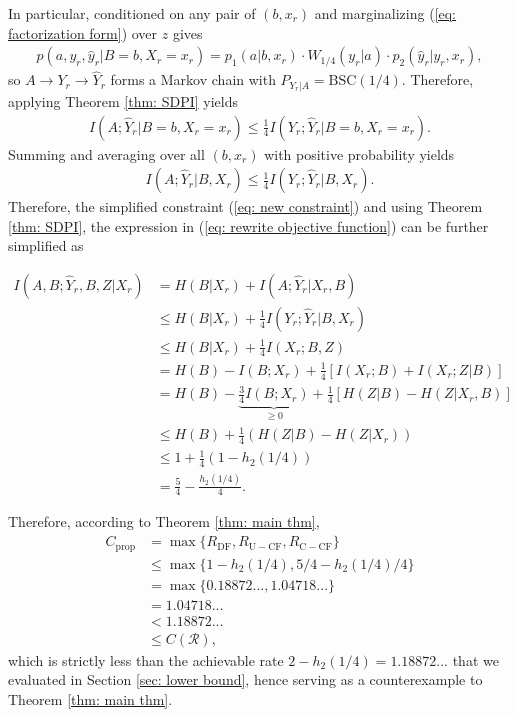 \documentclass[12pt]{article}
\theoremstyle{definition}
\begin{document}
In particular, conditioned on any pair of $(b,x_r)$ and marginalizing (\ref{eq: factorization form}) over $z$ gives
\begin{align*}
    p(a, y_r, \hat{y}_r| B = b, X_r = x_r) = p_1(a|b, x_r) \cdot W_{1/4}(y_r|a) \cdot p_2(\hat{y}_r | y_r, x_r),
\end{align*}
so $A \to Y_r \to \hat{Y}_r$ forms a Markov chain with $P_{Y_r|A} = \mathrm{BSC}(1/4)$. Therefore, applying Theorem \ref{thm: SDPI} yields
\begin{align*}
    I(A; \hat{Y}_r | B = b , X_r =  x_r) \leq \frac{1}{4}I(Y_r; \hat{Y}_r | B = b, X_r = x_r).
\end{align*}
Summing and averaging over all $(b,x_r)$ with positive probability yields
\begin{align*}
    I(A; \hat{Y}_r | B, X_r) \leq \frac{1}{4}I(Y_r; \hat{Y}_r | B, X_r). \label{eq: contraction from SDPI}
\end{align*}
Therefore, the simplified constraint (\ref{eq: new constraint}) and using Theorem \ref{thm: SDPI}, the expression in (\ref{eq: rewrite objective function}) can be further simplified as

\begin{align*}
    I(A, B;\hat{Y}_r, B, Z | X_r) & = H(B|X_r) + I(A;\hat{Y}_r | X_r, B) \\
    & \leq H(B|X_r) + \frac{1}{4}I(Y_r; \hat{Y}_r | B, X_r) \\
    & \leq H(B|X_r) + \frac{1}{4}I(X_r; B, Z) \\
    & = H(B) - I(B; X_r) + \frac{1}{4}\left[ I(X_r; B) + I(X_r; Z|B)\right] \\
    & = H(B) - \underbrace{\frac{3}{4} I(B; X_r)}_{\geq 0} + \frac{1}{4}\left[H(Z|B) - H(Z|X_r, B) \right] \\
    & \leq H(B) + \frac{1}{4}\left(H(Z|B) - H(Z|X_r)\right) \\
    & \leq 1 + \frac{1}{4}(1 - h_2(1/4)) \\
    & = \frac{5}{4} - \frac{h_2(1/4)}{4}.
\end{align*}

Therefore, according to Theorem \ref{thm: main thm},
\begin{align*}
    C_{\mathrm{prop}} & = \max\{R_{\mathrm{DF}}, R_{\mathrm{U-CF}}, R_{\mathrm{C-CF}}\} \\
    & \leq \max\{1 - h_2(1/4), 5/4 - h_2(1/4) / 4\} \\
    & = \max\{0.18872..., 1.04718... \} \\
    & = 1.04718... \\
    & < 1.18872... \\
    & \leq C(\mathcal R),
\end{align*}
which is strictly less than the achievable rate $2 - h_2(1/4) = 1.18872...$ that we evaluated in Section \ref{sec: lower bound}, hence serving as a counterexample to Theorem \ref{thm: main thm}.
\end{document}
